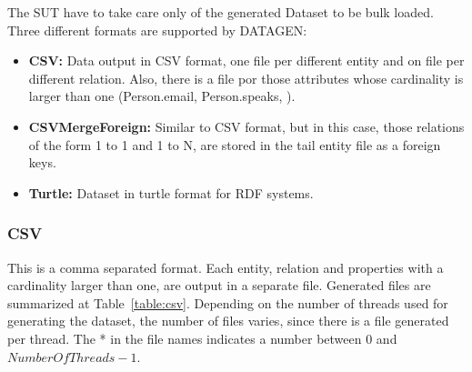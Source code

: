 The SUT have to take care only of the generated Dataset to be bulk loaded.
Three different formats are supported by DATAGEN:

\begin{itemize}
  \item \textbf{CSV:} Data output in CSV format, one file per different entity and on file
    per different relation. Also, there is a file por those attributes whose
    cardinality is larger than one (\ie Person.email, Person.speaks, \etc).
  \item \textbf{CSVMergeForeign:} Similar to CSV format, but in this case, those
    relations of the form 1 to 1 and 1 to N, are stored in the tail entity file as
    a foreign keys.
  \item \textbf{Turtle:} Dataset in turtle format for RDF systems.
\end{itemize}



\subsubsection{CSV}

This is a comma separated format. Each entity, relation and properties with a
cardinality larger than one, are output in a separate file. Generated files are
summarized at Table~\ref{table:csv}.  Depending on the number of threads used
for generating the dataset, the number of files varies, since there is a file
generated per thread. The * in the file names indicates a number between 0 and
$\mathit{NumberOfThreads}-1$.

